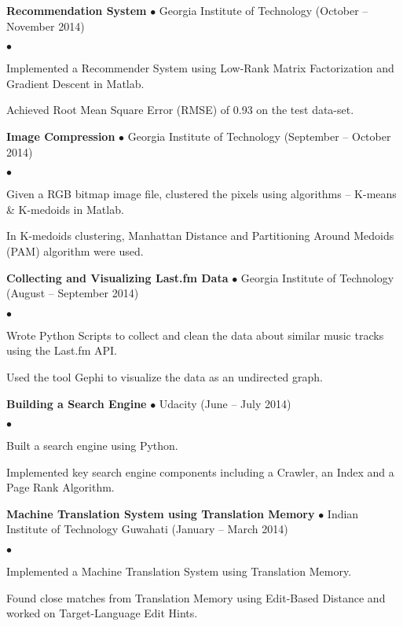 \documentclass[10pt]{article}
\newcommand{\project}[3]{{ \textbf{#1} $\bullet$ #2 \hfill (#3)\\  }}
\newenvironment{achievements}{\begin{list}{$\bullet$}{\topsep 0pt \itemsep 0pt}}{\end{list}}
\begin{document}
\project{Recommendation System}{Georgia Institute of Technology}{October -- November 2014}
	\begin{achievements}
	\item Implemented a Recommender System using Low-Rank Matrix Factorization and Gradient Descent in Matlab.
	\item Achieved Root Mean Square Error (RMSE) of 0.93 on the test data-set.
	\end{achievements}	

\project{Image Compression}{Georgia Institute of Technology}{September -- October 2014}
	\begin{achievements}
	\item Given a RGB bitmap image file, clustered the pixels using algorithms -- K-means \& K-medoids in Matlab.
	\item In K-medoids clustering, Manhattan Distance and Partitioning Around Medoids (PAM) algorithm were used.
	\end{achievements}	

\project{Collecting and Visualizing Last.fm Data}{Georgia Institute of Technology}{August -- September 2014}
	\begin{achievements}
	\item Wrote Python Scripts to collect and clean the data about similar music tracks using the Last.fm API.
	\item Used the tool Gephi to visualize the data as an undirected graph.
	\end{achievements}	

\project{Building a Search Engine}{Udacity}{June -- July 2014}
	\begin{achievements}
	\item Built a search engine using Python.
	\item Implemented key search engine components including a Crawler, an Index and a Page Rank Algorithm.
	\end{achievements}
	
\project{Machine Translation System using Translation Memory}{Indian Institute of Technology Guwahati}{January -- March 2014}
	\begin{achievements}
	\item Implemented a Machine Translation System using Translation Memory.
	\item Found close matches from Translation Memory using Edit-Based Distance and worked on Target-Language Edit Hints.
	\end{achievements}	
	
\end{document}
